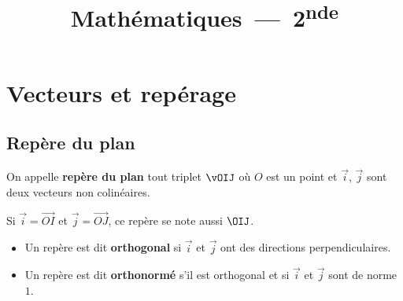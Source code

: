 \documentclass{poly}
\title{Mathématiques~---~2\textsuperscript{nde}}
\author{}
\date{}
\begin{document}

\chapter{Vecteurs et repérage}

\section{Repère du plan}

\begin{defin}
	On appelle \textbf{repère du plan} tout triplet $\vOIJ$ où $O$ est un point et $\vec{i}$, $\vec{j}$ sont deux vecteurs non colinéaires.

	Si $\vec{i} = \vec{OI}$ et $\vec{j} = \vec{OJ}$, ce repère se note aussi $\OIJ$.

	\begin{itemize}
		\item Un repère est dit \textbf{orthogonal} si $\vec{i}$ et $\vec{j}$ ont des directions perpendiculaires.
		\item Un repère est dit \textbf{orthonormé} s'il est orthogonal et si $\vec{i}$ et $\vec{j}$ sont de norme $1$.
	\end{itemize}


\end{defin}
\end{document}

